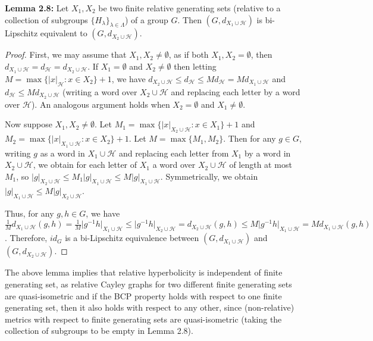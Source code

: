 \documentclass[12pt]{article}
\newcommand{\vs}{\vskip10pt}
\begin{document}
	\vs 
	
	\textbf{Lemma 2.8: } Let $X_1, X_2$ be two finite relative generating sets (relative to a collection of subgroups $\{H_{\lambda}\}_{\lambda \in \Lambda}$) of a group $G$. Then $(G, d_{X_1 \cup \mathcal{H}})$ is bi-Lipschitz equivalent to $(G, d_{X_2 \cup \mathcal{H}})$. 
	
	\begin{proof}
		
		First, we may assume that $X_1, X_2 \neq \emptyset$, as if both $X_1, X_2 = \emptyset$, then $d_{X_1 \cup \mathcal{H}} = d_{\mathcal{H}} = d_{X_2 \cup \mathcal{H}}$. If $X_1 = \emptyset$ and $X_2 \neq \emptyset$ then letting $M = \max \{\vert x \vert_{\mathcal{H}}: x \in X_2\} + 1$, we have $d_{X_2 \cup \mathcal{H}} \leq d_{\mathcal{H}} \leq M d_{\mathcal{H}}   = M d_{X_1 \cup \mathcal{H}}$ and $d_{\mathcal{H}} \leq M d_{X_2 \cup \mathcal{H}}$ (writing a word over $X_2 \cup \mathcal{H}$ and replacing each letter by a word over $\mathcal{H}$). An analogous argument holds when $X_2 = \emptyset$ and $X_1 \neq \emptyset$. 
		
		\vs
		
		Now suppose $X_1, X_2 \neq \emptyset$. Let $M_1 = \max \{\vert x \vert_{X_2 \cup \mathcal{H}} : x \in X_1\} + 1$ and $M_2  = \max \{\vert x \vert_{X_1 \cup \mathcal{H}}: x \in X_2\} + 1$. Let $M = \max \{M_1, M_2\}$. Then for any $g \in G$, writing $g$ as a word in $X_1 \cup \mathcal{H}$ and replacing each letter from $X_1$ by a word in $X_2 \cup \mathcal{H}$, we obtain for each letter of $X_1$ a word over $X_2 \cup \mathcal{H}$ of length at most $M_1$, so $\vert g \vert_{X_2 \cup \mathcal{H}} \leq M_1 \vert g \vert_{X_1 \cup \mathcal{H}} \leq M \vert g \vert_{X_1 \cup \mathcal{H}}$. Symmetrically, we obtain $\vert g \vert_{X_1 \cup \mathcal{H}} \leq M \vert g \vert_{X_2 \cup \mathcal{H}}$.
		
		\vs
		
		 Thus, for any $g, h \in G$, we have $\frac{1}{M} d_{X_1 \cup \mathcal{H}}(g,h) = \frac{1}{M} \vert g^{-1}h \vert_{X_1 \cup \mathcal{H}} \leq \vert g^{-1}h \vert_{X_2 \cup \mathcal{H}} = d_{X_2 \cup \mathcal{H}}(g,h) \leq M \vert g^{-1}h \vert_{X_1 \cup \mathcal{H}} = M d_{X_1 \cup \mathcal{H}} (g,h)$. Therefore, $id_G$ is a bi-Lipschitz equivalence between $(G, d_{X_1 \cup \mathcal{H}})$ and $(G, d_{X_2 \cup \mathcal{H}})$. 
		
	\end{proof}

	\vs 
	
	The above lemma implies that relative hyperbolicity is independent of finite generating set, as relative Cayley graphs for two different finite generating sets are quasi-isometric and if the BCP property holds with respect to one finite generating set, then it also holds with respect to any other, since (non-relative) metrics with respect to finite generating sets are quasi-isometric (taking the collection of subgroups to be empty in Lemma 2.8).
	
\end{document}
